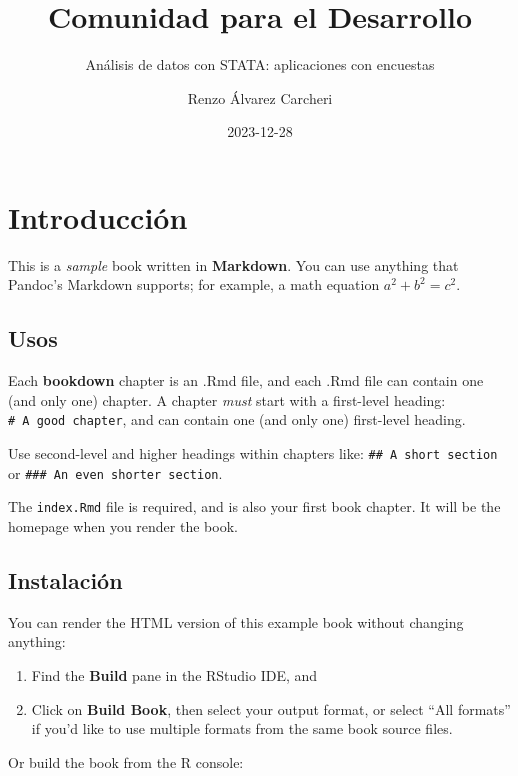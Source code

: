 \documentclass[
]{book}
\title{Comunidad para el Desarrollo}
\subtitle{Análisis de datos con STATA: aplicaciones con encuestas}
\author{Renzo Álvarez Carcheri}
\date{2023-12-28}
\theoremstyle{definition}
\theoremstyle{definition}
\theoremstyle{definition}
\theoremstyle{definition}
\theoremstyle{remark}
\begin{document}
\maketitle

{
\setcounter{tocdepth}{1}
\tableofcontents
}
\hypertarget{introducciuxf3n}{%
\chapter{Introducción}\label{introducciuxf3n}}

This is a \emph{sample} book written in \textbf{Markdown}. You can use anything that Pandoc's Markdown supports; for example, a math equation \(a^2 + b^2 = c^2\).

\hypertarget{usos}{%
\section{Usos}\label{usos}}

Each \textbf{bookdown} chapter is an .Rmd file, and each .Rmd file can contain one (and only one) chapter. A chapter \emph{must} start with a first-level heading: \texttt{\#\ A\ good\ chapter}, and can contain one (and only one) first-level heading.

Use second-level and higher headings within chapters like: \texttt{\#\#\ A\ short\ section} or \texttt{\#\#\#\ An\ even\ shorter\ section}.

The \texttt{index.Rmd} file is required, and is also your first book chapter. It will be the homepage when you render the book.

\hypertarget{instalaciuxf3n}{%
\section{Instalación}\label{instalaciuxf3n}}

You can render the HTML version of this example book without changing anything:

\begin{enumerate}
\def\labelenumi{\arabic{enumi}.}
\item
  Find the \textbf{Build} pane in the RStudio IDE, and
\item
  Click on \textbf{Build Book}, then select your output format, or select ``All formats'' if you'd like to use multiple formats from the same book source files.
\end{enumerate}

Or build the book from the R console:
\end{document}
